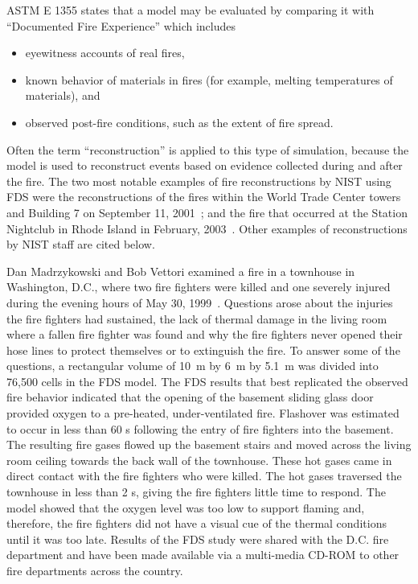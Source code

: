 ASTM E 1355 states that a model may be evaluated by comparing it with ``Documented Fire Experience'' which includes
\begin{itemize}
\item eyewitness accounts of real fires,
\item known behavior of materials in fires (for example, melting temperatures of materials), and
\item observed post-fire conditions, such as the extent of fire spread.
\end{itemize}
Often the term ``reconstruction'' is applied to this type of simulation, because the model is used to reconstruct events based on evidence collected during and after the
fire. The two most
notable examples of fire reconstructions by NIST using FDS were the reconstructions of the fires within the World Trade Center towers and Building 7 on September 11, 2001~\cite{NIST_NCSTAR_1-5F};
and the fire that occurred at the Station Nightclub in Rhode Island in February, 2003~\cite{Grosshandler:Station}. Other examples of reconstructions by NIST staff are
cited below.


Dan Madrzykowski and Bob Vettori examined a fire in a townhouse in Washington, D.C., where
two fire fighters were killed and one severely injured during the evening hours of May 30, 1999~\cite{Madrzykowski:1}. Questions arose
about the injuries the fire fighters had sustained, the lack of thermal damage in the living room where a fallen fire fighter was found and why the
fire fighters never opened their hose lines to protect themselves or to extinguish the fire.
To answer some of the questions, a rectangular volume of 10~m by 6~m by 5.1~m was divided into 76,500 cells in the FDS model. The FDS results that
best replicated the observed fire behavior indicated that the opening of the basement sliding glass door provided oxygen to a pre-heated,
under-ventilated fire. Flashover was estimated to occur in less than 60 s following the entry of fire fighters into the basement. The resulting fire
gases flowed up the basement stairs and moved across the living room ceiling towards the back wall of the townhouse. These hot gases came in direct
contact with the fire fighters who were killed. The hot gases traversed the townhouse in less than 2 s, giving the fire fighters little time to
respond. The model showed that the oxygen level was too low to support flaming and, therefore, the fire fighters did not have a visual cue of the
thermal conditions until it was too late. Results of the FDS study were shared with the D.C. fire department and have been made available via a
multi-media CD-ROM to other fire departments across the country.

